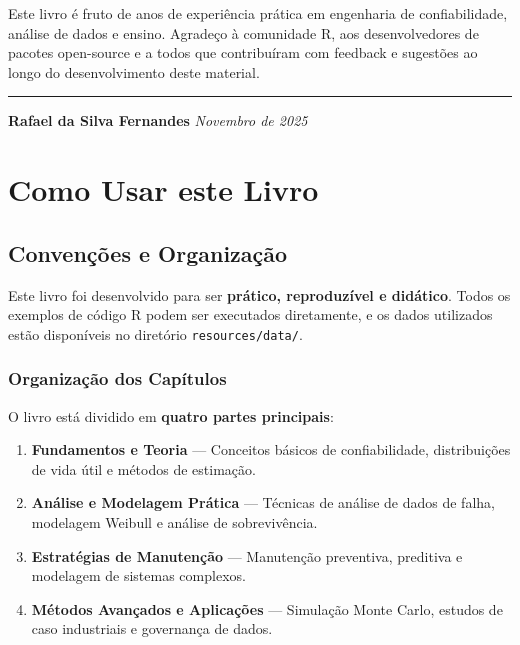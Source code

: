 \documentclass[
  letterpaper,
]{book}
\providecommand{\tightlist}{%
  \setlength{\itemsep}{0pt}\setlength{\parskip}{0pt}}\usepackage{longtable,booktabs,array}
\begin{document}

Este livro é fruto de anos de experiência prática em engenharia de
confiabilidade, análise de dados e ensino. Agradeço à comunidade R, aos
desenvolvedores de pacotes open-source e a todos que contribuíram com
feedback e sugestões ao longo do desenvolvimento deste material.

\begin{center}\rule{0.5\linewidth}{0.5pt}\end{center}

\textbf{Rafael da Silva Fernandes} \emph{Novembro de 2025}


\chapter*{Como Usar este Livro}\label{como-usar-este-livro-1}


\section*{Convenções e
Organização}\label{convenuxe7uxf5es-e-organizauxe7uxe3o}


Este livro foi desenvolvido para ser \textbf{prático, reproduzível e
didático}. Todos os exemplos de código R podem ser executados
diretamente, e os dados utilizados estão disponíveis no diretório
\texttt{resources/data/}.

\subsection*{Organização dos
Capítulos}\label{organizauxe7uxe3o-dos-capuxedtulos}

O livro está dividido em \textbf{quatro partes principais}:

\begin{enumerate}
\def\labelenumi{\arabic{enumi}.}
\tightlist
\item
  \textbf{Fundamentos e Teoria} --- Conceitos básicos de confiabilidade,
  distribuições de vida útil e métodos de estimação.
\item
  \textbf{Análise e Modelagem Prática} --- Técnicas de análise de dados
  de falha, modelagem Weibull e análise de sobrevivência.
\item
  \textbf{Estratégias de Manutenção} --- Manutenção preventiva,
  preditiva e modelagem de sistemas complexos.
\item
  \textbf{Métodos Avançados e Aplicações} --- Simulação Monte Carlo,
  estudos de caso industriais e governança de dados.
\end{enumerate}
\end{document}
